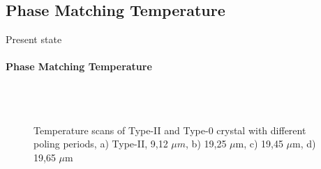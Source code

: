 \documentclass[serif,8pt]{beamer}
\begin{document}
\subsection{Phase Matching Temperature}
\begin{frame}{Present state}
	\framesubtitle{Phase Matching Temperature}
	\begin{figure}[!ht]
	  \centering
	  \caption{Temperature scans of Type-II and Type-0 crystal with different poling periods, a) Type-II, 9,12 $\mu m$, 
	  b) 19,25 $\mu$m, c) 19,45 $\mu$m, d) 19,65 $\mu$m}
	  \quad
	  \\
	  \quad
	  \\
	  \label{fig:gratings}
	\end{figure}
\end{frame}
\end{document}
